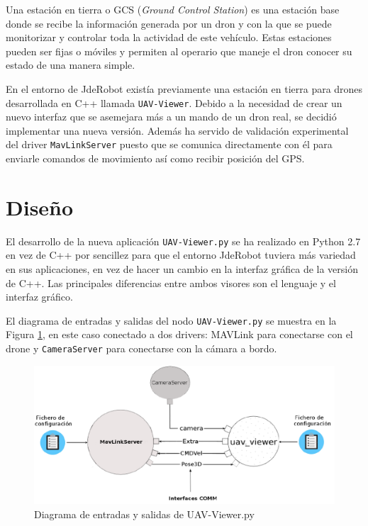 \label{visor uavViewer}

Una estación en tierra o GCS (\textit{Ground Control Station}) es una estación base donde se recibe la
información generada por un dron y con la que se puede monitorizar y controlar toda la actividad
de este vehículo. Estas estaciones pueden ser fijas o móviles y permiten al operario que maneje el dron
conocer su estado de una manera simple.

En el entorno de JdeRobot existía previamente una estación en tierra para drones desarrollada en C++ llamada \texttt{UAV-Viewer}. Debido a la necesidad de crear un nuevo interfaz que se asemejara más a un mando de un dron real, se decidió implementar una nueva versión. Además ha servido de validación experimental del driver \texttt{MavLinkServer} puesto que se comunica directamente con él para enviarle comandos de movimiento así como recibir posición del GPS.

\section{Diseño}

El desarrollo de la nueva aplicación \texttt{UAV-Viewer.py} se ha realizado en Python 2.7 en vez de C++ por sencillez para que el entorno JdeRobot tuviera más variedad en sus aplicaciones, en vez de hacer un cambio en la interfaz gráfica de la versión de C++. Las principales diferencias entre ambos visores son el lenguaje y el interfaz gráfico. 

El diagrama de entradas y salidas del nodo \texttt{UAV-Viewer.py} se muestra en la Figura \ref{fig:esquemaUav}, en este caso
conectado a dos drivers: MAVLink para conectarse con el drone y \texttt{CameraServer} para conectarse con
la cámara a bordo.

\begin{figure}[H]
  \centering
  \includegraphics[scale=0.4]{imagenes/MapaGeneral.png}
  \caption{Diagrama de entradas y salidas de UAV-Viewer.py}
  \label{fig:esquemaUav}
\end{figure}

